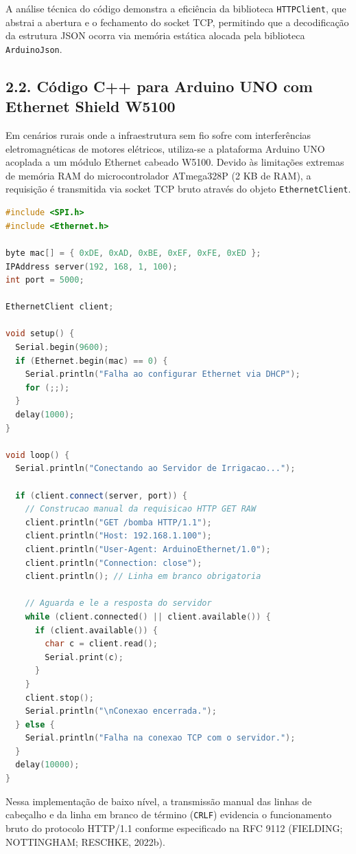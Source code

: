 A análise técnica do código demonstra a eficiência da biblioteca \texttt{HTTPClient}, que abstrai a abertura e o fechamento do socket TCP, permitindo que a decodificação da estrutura JSON ocorra via memória estática alocada pela biblioteca \texttt{ArduinoJson}.

\newpage

\subsection*{2.2. Código C++ para Arduino UNO com Ethernet Shield W5100}

Em cenários rurais onde a infraestrutura sem fio sofre com interferências eletromagnéticas de motores elétricos, utiliza-se a plataforma Arduino UNO acoplada a um módulo Ethernet cabeado W5100. Devido às limitações extremas de memória RAM do microcontrolador ATmega328P (2 KB de RAM), a requisição é transmitida via socket TCP bruto através do objeto \texttt{EthernetClient}.

\begin{lstlisting}[language=C++]
#include <SPI.h>
#include <Ethernet.h>

byte mac[] = { 0xDE, 0xAD, 0xBE, 0xEF, 0xFE, 0xED };
IPAddress server(192, 168, 1, 100);
int port = 5000;

EthernetClient client;

void setup() {
  Serial.begin(9600);
  if (Ethernet.begin(mac) == 0) {
    Serial.println("Falha ao configurar Ethernet via DHCP");
    for (;;);
  }
  delay(1000);
}

void loop() {
  Serial.println("Conectando ao Servidor de Irrigacao...");

  if (client.connect(server, port)) {
    // Construcao manual da requisicao HTTP GET RAW
    client.println("GET /bomba HTTP/1.1");
    client.println("Host: 192.168.1.100");
    client.println("User-Agent: ArduinoEthernet/1.0");
    client.println("Connection: close");
    client.println(); // Linha em branco obrigatoria

    // Aguarda e le a resposta do servidor
    while (client.connected() || client.available()) {
      if (client.available()) {
        char c = client.read();
        Serial.print(c);
      }
    }
    client.stop();
    Serial.println("\nConexao encerrada.");
  } else {
    Serial.println("Falha na conexao TCP com o servidor.");
  }
  delay(10000);
}
\end{lstlisting}

Nessa implementação de baixo nível, a transmissão manual das linhas de cabeçalho e da linha em branco de término (\texttt{CRLF}) evidencia o funcionamento bruto do protocolo HTTP/1.1 conforme especificado na RFC 9112 (FIELDING; NOTTINGHAM; RESCHKE, 2022b).

